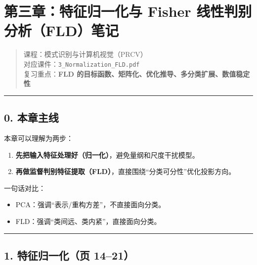 \documentclass[
]{article}
\author{}
\date{}
\providecommand{\tightlist}{%
  \setlength{\itemsep}{0pt}\setlength{\parskip}{0pt}}
\begin{document}
\section{第三章：特征归一化与 Fisher
线性判别分析（FLD）笔记}\label{ux7b2cux4e09ux7ae0ux7279ux5f81ux5f52ux4e00ux5316ux4e0e-fisher-ux7ebfux6027ux5224ux522bux5206ux6790fldux7b14ux8bb0}

\begin{quote}
课程：模式识别与计算机视觉（PRCV）\\
对应课件：\texttt{3\_Normalization\_FLD.pdf}\\
复习重点：\textbf{FLD
的目标函数、矩阵化、优化推导、多分类扩展、数值稳定性}
\end{quote}

\begin{center}\rule{0.5\linewidth}{0.5pt}\end{center}

\subsection{0. 本章主线}\label{ux672cux7ae0ux4e3bux7ebf}

本章可以理解为两步：

\begin{enumerate}
\def\labelenumi{\arabic{enumi}.}
\tightlist
\item
  \textbf{先把输入特征处理好（归一化）}，避免量纲和尺度干扰模型。\\
\item
  \textbf{再做监督判别特征提取（FLD）}，直接围绕``分类可分性''优化投影方向。
\end{enumerate}

一句话对比：

\begin{itemize}
\tightlist
\item
  PCA：强调``表示/重构方差''，不直接面向分类。
\item
  FLD：强调``类间远、类内紧''，直接面向分类。
\end{itemize}

\begin{center}\rule{0.5\linewidth}{0.5pt}\end{center}

\subsection{1. 特征归一化（页
14--21）}\label{ux7279ux5f81ux5f52ux4e00ux5316ux9875-1421}
\end{document}
